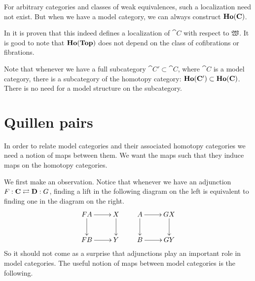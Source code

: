 For arbitrary categories and classes of weak equivalences, such a localization need not exist. But when we have a model category, we can always construct $\mathbf{Ho}(\mathbf{C})$.


In \cite{dwyer} it is proven that this indeed defines a localization of $\cat{C}$ with respect to $\mathfrak{W}$. It is good to note that $\mathbf{Ho}(\mathbf{Top})$ does not depend on the class of cofibrations or fibrations.

Note that whenever we have a full subcategory $\cat{C'} \subset \cat{C}$, where $\cat{C}$ is a model category, there is a subcategory of the homotopy category: $\mathbf{Ho}(\mathbf{C'}) \subset \mathbf{Ho}(\mathbf{C})$. There is no need for a model structure on the subcategory.



\section{Quillen pairs}
In order to relate model categories and their associated homotopy categories we need a notion of maps between them. We want the maps such that they induce maps on the homotopy categories.

We first make an observation. Notice that whenever we have an adjunction $F : \mathbf{C} \rightleftarrows \mathbf{D} : G$, finding a lift in the following diagram on the left is equivalent to finding one in the diagram on the right.
\[\xymatrix{
	FA \ar[r] \ar[d] & X \ar[d] \\
	FB \ar[r] & Y
}\qquad\xymatrix{
	A \ar[r] \ar[d] & GX \ar[d] \\
	B \ar[r] & GY
}\]
So it should not come as a surprise that adjunctions play an important role in model categories. The useful notion of maps between model categories is the following.

